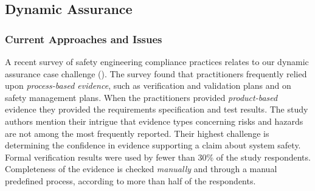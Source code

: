 


\subsection{Dynamic Assurance}

\subsubsection{Current Approaches and Issues} 



A recent survey of safety engineering compliance practices relates to our dynamic assurance case  challenge (\cite{RESSJ2013}).  The survey found that practitioners frequently relied upon {\em process-based evidence}, such as verification and validation plans and on safety management plans. When the practitioners provided {\em product-based\/} evidence they provided the requirements specification and test results. The study authors mention their intrigue that evidence types concerning risks and hazards are not among the most frequently reported. 
Their highest challenge is determining the confidence in evidence supporting a claim about system safety. 
Formal verification results were used by fewer than 30\% of the study respondents.  Completeness of the evidence is checked {\em manually\/} and through a manual predefined process, according to more than half of the respondents. 

